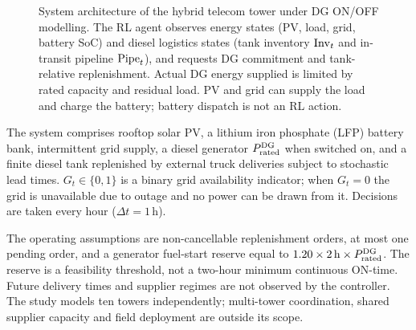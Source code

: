 \begin{figure}[htbp]
{%
}
\caption{System architecture of the hybrid telecom tower under DG ON/OFF
modelling. The RL agent observes energy states (PV, load, grid, battery SoC)
and diesel logistics states (tank inventory $\mathrm{Inv}_t$ and in-transit pipeline
$\mathrm{Pipe}_t$), and requests DG commitment and tank-relative replenishment.
Actual DG energy supplied is limited by rated capacity and residual
load. PV and grid can supply the load and charge the battery; battery
dispatch is not an RL action.}
\label{fig:system_diagram}
\end{figure}

The system comprises rooftop solar PV, a lithium iron phosphate (LFP) battery
bank, intermittent grid supply, a diesel generator 
$P_{\mathrm{rated}}^{\mathrm{DG}}$ when switched on, and a finite diesel tank
replenished by external truck deliveries subject to stochastic lead times.
$G_t \in \{0,1\}$ is a binary grid availability indicator; when $G_t = 0$ the
grid is unavailable due to outage and no power can be drawn from it.
Decisions are taken every hour ($\Delta t = 1$\,h).
\begin{revisedblock}
The operating assumptions are non-cancellable replenishment orders,
at most one pending order, and a generator fuel-start reserve equal to
$1.20\times2\,\mathrm{h}\times P_{\mathrm{rated}}^{\mathrm{DG}}$.
The reserve is a feasibility threshold, not a two-hour minimum
continuous ON-time. Future delivery times and supplier regimes are
not observed by the controller.
The study models ten towers independently; multi-tower coordination,
shared supplier capacity and field deployment are outside its scope.
\end{revisedblock}


